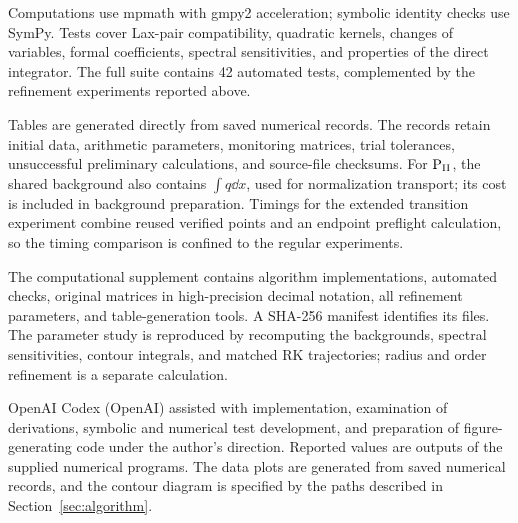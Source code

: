 Computations use mpmath with gmpy2 acceleration; symbolic identity
checks use SymPy. Tests cover Lax-pair compatibility, quadratic kernels,
changes of variables, formal coefficients, spectral sensitivities,
and properties of the direct integrator. The full suite contains
42 automated tests, complemented by the refinement experiments reported
above.

Tables are generated directly from saved numerical records.
The records retain initial data, arithmetic parameters, monitoring
matrices, trial tolerances, unsuccessful preliminary calculations,
and source-file checksums. For $\mathrm{P}_{\mathrm{II}}$, the shared background also
contains $\int q\dd x$, used for normalization transport; its cost is
included in background preparation. Timings for the extended transition
experiment combine reused verified points and an endpoint preflight
calculation, so the timing comparison is confined to the regular
experiments.

The computational supplement contains algorithm implementations,
automated checks, original matrices in high-precision decimal notation,
all refinement parameters, and table-generation tools. A SHA-256
manifest identifies its files. The parameter study is reproduced by
recomputing the backgrounds, spectral sensitivities, contour integrals,
and matched RK trajectories; radius and order refinement is a separate
calculation.

OpenAI Codex (OpenAI) assisted with implementation, examination of
derivations, symbolic and numerical test development, and preparation
of figure-generating code under the author's direction. Reported values
are outputs of the supplied numerical programs. The data plots are
generated from saved numerical records, and the contour diagram is
specified by the paths described in Section~\ref{sec:algorithm}.
